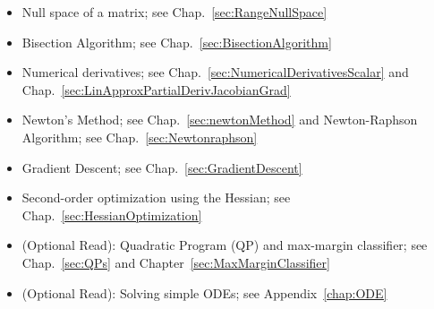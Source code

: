 \begin{itemize}
    \item Null space of a matrix; see Chap.~\ref{sec:RangeNullSpace}
    \item Bisection Algorithm; see Chap.~\ref{sec:BisectionAlgorithm}
    \item Numerical derivatives; see Chap.~\ref{sec:NumericalDerivativesScalar} and Chap.~\ref{sec:LinApproxPartialDerivJacobianGrad}
    \item Newton's Method; see Chap.~\ref{sec:newtonMethod} and Newton-Raphson Algorithm; see Chap.~\ref{sec:Newtonraphson}
    \item Gradient Descent; see Chap.~\ref{sec:GradientDescent}
    \item Second-order optimization using the Hessian; see Chap.~\ref{sec:HessianOptimization}
    \item (Optional Read): Quadratic Program (QP) and max-margin classifier; see Chap.~\ref{sec:QPs} and Chapter~\ref{sec:MaxMarginClassifier}
    \item (Optional Read): Solving simple ODEs; see Appendix~\ref{chap:ODE}
\end{itemize}